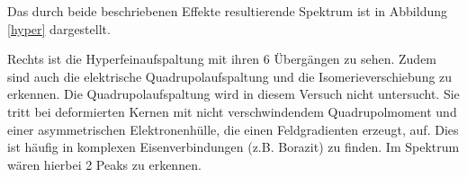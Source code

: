 Das durch beide beschriebenen Effekte resultierende Spektrum ist in Abbildung \ref{hyper} dargestellt.


Rechts ist die Hyperfeinaufspaltung mit ihren 6 Übergängen zu sehen. Zudem sind auch die elektrische Quadrupolaufspaltung und die Isomerieverschiebung zu erkennen. Die Quadrupolaufspaltung wird in diesem Versuch nicht untersucht. Sie tritt bei deformierten Kernen mit nicht verschwindendem Quadrupolmoment und einer asymmetrischen Elektronenhülle, die einen Feldgradienten erzeugt, auf. Dies ist häufig in komplexen Eisenverbindungen (z.B. Borazit) zu finden. Im Spektrum wären hierbei 2 Peaks zu erkennen.
